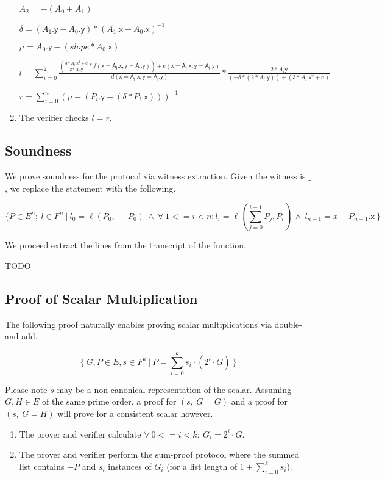 \documentclass[]{article}
\begin{document}
\begin{enumerate}
		$A_2 = -(A_0 + A_1)$
		
		$\delta = (A_1\mathsf{.y} - A_0\mathsf{.y}) * (A_1\mathsf{.x} - A_0\mathsf{.x})^{-1}$
		
		$\mu = A_0\mathsf{.y} - (slope * A_0\mathsf{.x})$
		
		$l = \sum^2_{i=0}
		\frac{
		  (
		    \frac{
  			  3 * A_i\mathsf{.x}^2 + a
  	        }{
	          2 * A_i\mathsf{.y}
            } *
		    f(\mathsf{x = A_i.x, y = A_i.y})
		  ) + e(\mathsf{x = A_i.x, y = A_i.y})
	    }{
	      d(\mathsf{x = A_i.x, y = A_i.y})
        }
    	*
		\frac{
		  2 * A_i\mathsf{y}
	    }{
	      (-\delta * (2 * A_i\mathsf{.y})) + (3 * A_i\mathsf{.x}^2 + a)
        }$
		
		$r = \sum^n_{i=0} (\mu - (P_i\mathsf{.y} + (\delta * P_i\mathsf{.x})))^{-1}$
		
		\item The verifier checks $l = r$.
	\end{enumerate}
	
	\subsection{Soundness}
	
	We prove soundness for the protocol via witness extraction. Given the witness is $\_$, we replace the statement with the following.
	
	$$\{
	  P \in E^n;~
	  l \in F^n ~|~
	  l_0 = \ell(P_0,~ -P_0) ~\wedge~
	  \forall~ 1 <= i < n: l_i = \ell(\sum^{i-1}_{j=0} P_j, P_i) ~\wedge~
	  l_{n-1} = x - P_{n-1}\mathsf{.x} ~
	\}$$
	
	We proceed extract the lines from the transcript of the function. 
	
	TODO
	
	\subsection{Proof of Scalar Multiplication}

	The following proof naturally enables proving scalar multiplications via double-and-add.

	$$
	\{~ G, P \in E, s \in F^k ~|~ P =  \sum^k_{i=0} s_i \cdot (2^i \cdot G) ~\}
	$$
	
	Please note $s$ may be a non-canonical representation of the scalar. Assuming $G, H \in E$ of the same prime order, a proof for $(s,~ G=G)$ and a proof for $(s,~ G=H)$ will prove for a consistent scalar however.
	
	\begin{enumerate}
		\item The prover and verifier calculate $\forall~ 0 <= i < k:~ G_i = 2^i \cdot G$.
		\item The prover and verifier perform the sum-proof protocol where the summed list contains $-P$ and $s_i$ instances of $G_i$ (for a list length of $1 + \sum^k_{i=0} s_i$).
	\end{enumerate}
\end{document}
